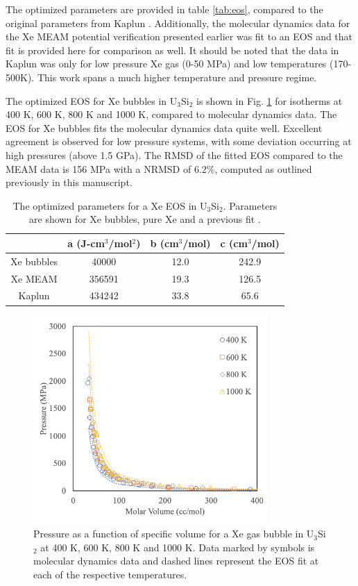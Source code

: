 \documentclass[review]{elsarticle}
\begin{document}
The optimized parameters are provided in table \ref{tab:eos}, compared to the original parameters from Kaplun \cite{kaplun2003}. Additionally, the molecular dynamics data for the Xe MEAM potential verification presented earlier was fit to an EOS and that fit is provided here for comparison as well. It should be noted that the data in Kaplun was only for low pressure Xe gas (0-50 MPa) and low temperatures (170-500K). This work spans a much higher temperature and pressure regime. 

The optimized EOS for Xe bubbles in U$_3$Si$_2$ is shown in Fig. \ref{fig:eos_sum} for isotherms at 400 K, 600 K, 800 K and 1000 K, compared to molecular dynamics data. The EOS for Xe bubbles fits the molecular dynamics data quite well. Excellent agreement is observed for low pressure systems, with some deviation occurring at high pressures (above 1.5 GPa). The RMSD of the fitted EOS compared to the MEAM data is 156 MPa with a NRMSD of 6.2\%, computed as outlined previously in this manuscript. 

\begin{table}[h]
\caption{The optimized parameters for a Xe EOS in U$_3$Si$_2$. Parameters are shown for Xe bubbles, pure Xe and a previous fit \cite{kaplun2003}.}\label{tab:eos}
\begin{center}
\begin{tabular}{|c|c|c|c|}
 \hline
  & a (J-cm$^3$/mol$^2$) & b (cm$^3$/mol) & c (cm$^3$/mol) \\ 
 \hline
 Xe bubbles & 40000 & 12.0 & 242.9 \\ 
 Xe MEAM & 356591 & 19.3 & 126.5 \\ 
 Kaplun \cite{kaplun2003} & 434242 & 33.8 & 65.6 \\ 
 \hline
\end{tabular}
\end{center}
\label{default}
\end{table}%


\begin{figure}[hbt]
	\centering
	\includegraphics[width=0.8\textwidth]{bubble_eosa.png}
 \caption{Pressure as a function of specific volume for a Xe gas bubble in U$_3$Si$_2$ at 400 K, 600 K, 800 K and 1000 K. Data marked by symbols is molecular dynamics data and dashed lines represent the EOS fit at each of the respective temperatures.}\label{fig:eos_sum}
\end{figure}
\end{document}
